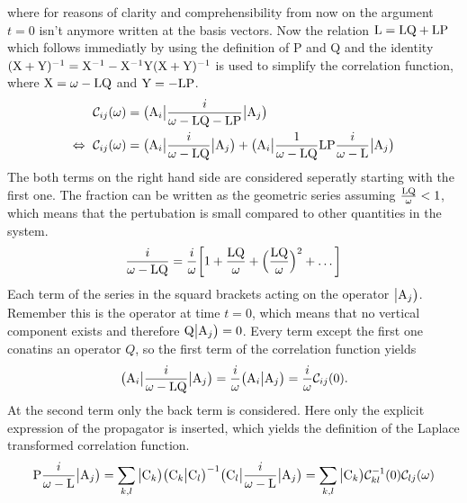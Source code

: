 %
where for reasons of clarity and comprehensibility from now on the argument $t=0$ isn't anymore written at the basis vectors.
Now the relation $\mathrm{L} = \mathrm{LQ} + \mathrm{LP}$ which follows immediatly by using the definition of P and Q and the identity $ (\mathrm{X} + \mathrm{Y})^{-1} = \mathrm{X}^{-1} - \mathrm{X}^{-1} \mathrm{Y} (\mathrm{X} + \mathrm{Y})^{-1}$ is used to simplify the correlation function, where $\mathrm{X} = \omega - \mathrm{LQ}$ and $\mathrm{Y} = -\mathrm{LP}$.
%
\begin{align}
	\mathcal{C}_{ij}(\omega) &= \big({\mathrm{A}_{i}}\big| \frac{i}{\omega - \mathrm{LQ} - \mathrm{LP}} \big|{\mathrm{A}_{j}}\big)
	\notag \\
	\Leftrightarrow\ \mathcal{C}_{ij}(\omega) &= \big({\mathrm{A}_{i}}\big| \frac{i}{\omega - \mathrm{LQ}} \big|{\mathrm{A}_{j}}\big) + \big({\mathrm{A}_{i}}\big| \frac{1}{\omega - \mathrm{LQ}} \mathrm{LP} \frac{i}{\omega - \mathrm{L}} \big|{\mathrm{A}_{j}}\big)
\end{align}
%
The both terms on the right hand side are considered seperatly starting with the first one.
The fraction can be written as the geometric series assuming $\frac{\mathrm{LQ}}{\omega} < 1$, which means that the pertubation is small compared to other quantities in the system. 
%
\begin{align}
	\frac{i}{\omega - \mathrm{LQ}} = \frac{i}{\omega} \bigg[1 + \frac{\mathrm{LQ}}{\omega} + \Big(\frac{\mathrm{LQ}}{\omega}\Big)^{2} + \dots \bigg]
\end{align}
%
Each term of the series in the squard brackets acting on the operator $\big|{\mathrm{A}_{j}}\big)$.
Remember this is the operator at time $t=0$, which means that no vertical component exists and therefore $\mathrm{Q}\big|{\mathrm{A}_{j}}\big) = 0$.
Every term except the first one conatins an operator $Q$, so the first term of the correlation function yields
%
\begin{align}
	\big({\mathrm{A}_{i}}\big| \frac{i}{\omega - \mathrm{LQ}} \big|{\mathrm{A}_{j}}\big) = \frac{i}{\omega} \big({\mathrm{A}_{i}}\big|{\mathrm{A}_{j}}\big) = \frac{i}{\omega} \mathcal{C}_{ij}(0).
\end{align}
%
At the second term only the back term is considered.
Here only the explicit expression of the propagator is inserted, which yields the definition of the Laplace transformed correlation function.
%
\begin{align}
	\mathrm{P} \frac{i}{\omega - \mathrm{L}} \big|{\mathrm{A}_{j}}\big) = \sum\limits_{k,l} \big|{\mathrm{C}_{k}}\big) \big({\mathrm{C}_{k}}\big|{\mathrm{C}_{l}}\big)^{-1} \big({\mathrm{C}_{l}}\big| \frac{i}{\omega - \mathrm{L}} \big|{\mathrm{A}_{j}}\big) = \sum\limits_{k,l} \big|{\mathrm{C}_{k}}\big) \mathcal{C}_{kl}^{-1}(0) \mathcal{C}_{lj}(\omega)
\end{align}
